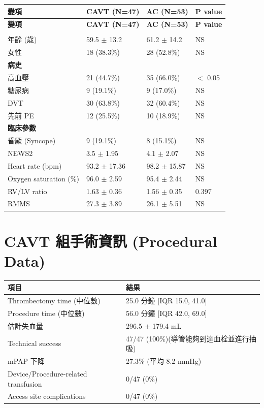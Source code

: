 \documentclass[11pt,a4paper]{article}
\begin{document}
\begin{longtable}{p{5cm}p{3.5cm}p{3.5cm}p{2cm}}
\toprule
\textbf{變項} & \textbf{CAVT (N=47)} & \textbf{AC (N=53)} & \textbf{P value} \\
\midrule
\endfirsthead
\toprule
\textbf{變項} & \textbf{CAVT (N=47)} & \textbf{AC (N=53)} & \textbf{P value} \\
\midrule
\endhead
\bottomrule
\endfoot
\multicolumn{4}{l}{\textbf{人口學特徵}} \\
\midrule
年齡 (歲) & 59.5 $\pm$ 13.2 & 61.2 $\pm$ 14.2 & NS \\
女性 & 18 (38.3\%) & 28 (52.8\%) & NS \\
\midrule
\multicolumn{4}{l}{\textbf{病史}} \\
\midrule
高血壓 & 21 (44.7\%) & 35 (66.0\%) & $<$ 0.05 \\
糖尿病 & 9 (19.1\%) & 9 (17.0\%) & NS \\
DVT & 30 (63.8\%) & 32 (60.4\%) & NS \\
先前 PE & 12 (25.5\%) & 10 (18.9\%) & NS \\
\midrule
\multicolumn{4}{l}{\textbf{臨床參數}} \\
\midrule
昏厥 (Syncope) & 9 (19.1\%) & 8 (15.1\%) & NS \\
NEWS2 & 3.5 $\pm$ 1.95 & 4.1 $\pm$ 2.07 & NS \\
Heart rate (bpm) & 93.2 $\pm$ 17.36 & 98.2 $\pm$ 15.87 & NS \\
Oxygen saturation (\%) & 96.0 $\pm$ 2.59 & 95.4 $\pm$ 2.44 & NS \\
RV/LV ratio & 1.63 $\pm$ 0.36 & 1.56 $\pm$ 0.35 & 0.397 \\
RMMS & 27.3 $\pm$ 3.89 & 26.1 $\pm$ 5.51 & NS \\
\bottomrule
\end{longtable}

\section{CAVT 組手術資訊 (Procedural Data)}

\begin{longtable}{p{6cm}p{8cm}}
\toprule
\textbf{項目} & \textbf{結果} \\
\midrule
\endfirsthead
\bottomrule
\endfoot
Thrombectomy time (中位數) & 25.0 分鐘 [IQR 15.0, 41.0] \\
\midrule
Procedure time (中位數) & 56.0 分鐘 [IQR 42.0, 69.0] \\
\midrule
估計失血量 & 296.5 $\pm$ 179.4 mL \\
\midrule
Technical success & 47/47 (100\%)\newline (導管能夠到達血栓並進行抽吸) \\
\midrule
mPAP 下降 & 27.3\% (平均 8.2 mmHg) \\
\midrule
Device/Procedure-related transfusion & 0/47 (0\%) \\
\midrule
Access site complications & 0/47 (0\%) \\
\bottomrule
\end{longtable}
\end{document}
